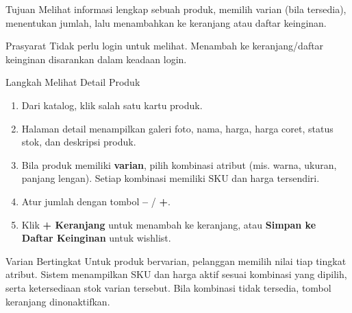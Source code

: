 
\begin{flowsection}{Tujuan}
Melihat informasi lengkap sebuah produk, memilih varian (bila tersedia),
menentukan jumlah, lalu menambahkan ke keranjang atau daftar keinginan.
\end{flowsection}

\begin{flowsection}{Prasyarat}
Tidak perlu login untuk melihat. Menambah ke keranjang/daftar keinginan
disarankan dalam keadaan login.
\end{flowsection}

\begin{flowsection}{Langkah Melihat Detail Produk}
\begin{enumerate}
  \item Dari katalog, klik salah satu kartu produk.
  \item Halaman detail menampilkan galeri foto, nama, harga, harga coret,
        status stok, dan deskripsi produk.
  \item Bila produk memiliki \textbf{varian}, pilih kombinasi atribut
        (mis. warna, ukuran, panjang lengan). Setiap kombinasi memiliki SKU dan
        harga tersendiri.
  \item Atur jumlah dengan tombol \textbf{--} / \textbf{+}.
  \item Klik \textbf{+ Keranjang} untuk menambah ke keranjang, atau
        \textbf{Simpan ke Daftar Keinginan} untuk wishlist.
\end{enumerate}
\end{flowsection}


\begin{flowsection}{Varian Bertingkat}
Untuk produk bervarian, pelanggan memilih nilai tiap tingkat atribut. Sistem
menampilkan SKU dan harga aktif sesuai kombinasi yang dipilih, serta ketersediaan
stok varian tersebut. Bila kombinasi tidak tersedia, tombol keranjang dinonaktifkan.
\end{flowsection}


